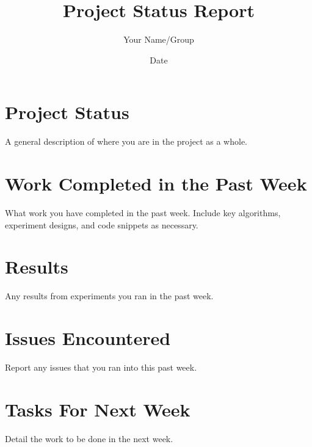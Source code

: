 \documentclass{article}
\begin{document}
   
\title{Project Status Report}
\author{Your Name/Group}
\date{Date}
\maketitle


\section{Project Status}

A general description of where you are in the project as a whole.

\section{Work Completed in the Past Week}

What work you have completed in the past week. Include key algorithms, experiment designs, and code snippets as necessary. 

\section{Results}

Any results from experiments you ran in the past week.

\section{Issues Encountered}

Report any issues that you ran into this past week.


\section{Tasks For Next Week}

Detail the work to be done in the next week.


   
\end{document}

